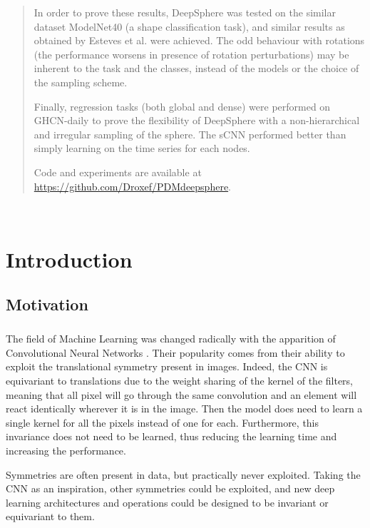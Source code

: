 \documentclass[11pt]{report}
\begin{document}
\begin{abstract}
In order to prove these results, DeepSphere was tested on the similar dataset ModelNet40 (a shape classification task), and similar results as obtained by Esteves et al. were achieved. The odd behaviour with rotations (the performance worsens in presence of rotation perturbations) may be inherent to the task and the classes, instead of the models or the choice of the sampling scheme.

Finally, regression tasks (both global and dense) were performed on GHCN-daily to prove the flexibility of DeepSphere with a non-hierarchical and irregular sampling of the sphere. The sCNN performed better than simply learning on the time series for each nodes.

Code and experiments are available at \url{https://github.com/Droxef/PDMdeepsphere}.
\end{abstract}
\vfill
\newpage
\thispagestyle{empty}
\mbox{~}
\cleardoublepage
\thispagestyle{empty}
\setcounter{secnumdepth}{3}
\setcounter{tocdepth}{2}
\thispagestyle{empty}
\clearpage
{}
\tableofcontents
\thispagestyle{empty}
\clearpage                        %
\chapter{Introduction}
\setcounter{page}{1}

\section{Motivation}
\paragraph*{}
The field of Machine Learning was changed radically with the apparition of Convolutional Neural Networks \cite{boureau_theoretical_2010}. Their popularity comes from their ability to exploit the translational symmetry present in images. Indeed, the CNN is equivariant to translations due to the weight sharing of the kernel of the filters, meaning that all pixel will go through the same convolution and an element will react identically wherever it is in the image. Then the model does need to learn a single kernel for all the pixels instead of one for each. Furthermore, this invariance does not need to be learned, thus reducing the learning time and increasing the performance.

Symmetries are often present in data, but practically never exploited. Taking the CNN as an inspiration, other symmetries could be exploited, and new deep learning architectures and operations could be designed to be invariant or equivariant to them. 
\end{document}
